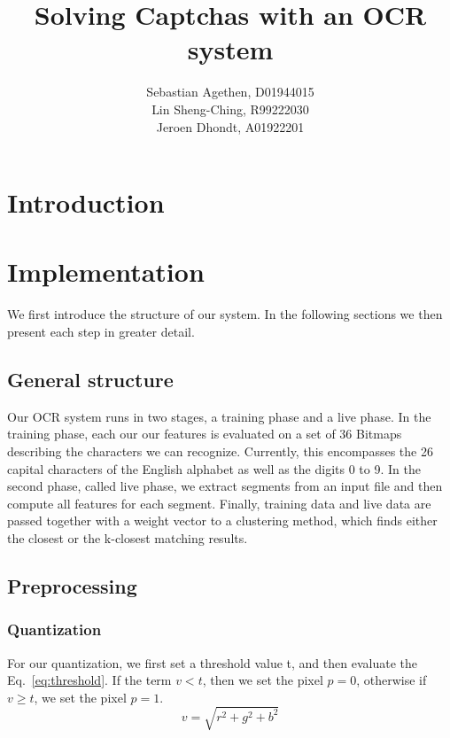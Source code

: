 \documentclass{article}
\begin{document}
\title{Solving Captchas with an OCR system}
\author{Sebastian Agethen, D01944015 \\ Lin Sheng-Ching, R99222030 \\ Jeroen Dhondt, A01922201 }

\onecolumn

\maketitle

\tableofcontents

\twocolumn

\section{Introduction}
\section{Implementation}
We first introduce the structure of our system. In the following sections we then present each step in greater detail.

\subsection{General structure}
Our OCR system runs in two stages, a training phase and a live phase. In the training phase, each our our features is evaluated on a set of 36 Bitmaps describing the characters we can recognize. Currently, this encompasses the 26 capital characters of the English alphabet as well as the digits 0 to 9. In the second phase, called live phase, we extract segments from an input file and then compute all features for each segment. Finally, training data and live data are passed together with a weight vector to a clustering method, which finds either the closest or the k-closest matching results.

\subsection{Preprocessing}

\subsubsection{Quantization}
For our quantization, we first set a threshold value t, and then evaluate the Eq.~\ref{eq:threshold}. If the term $v < t$, then we set the pixel $p = 0$, otherwise if $v \geq t$, we set the pixel $p = 1$.
\begin{equation}
v = \sqrt{r^2 + g^2 + b^2}
\label{eq:threshold}
\end{equation}
\end{document}
